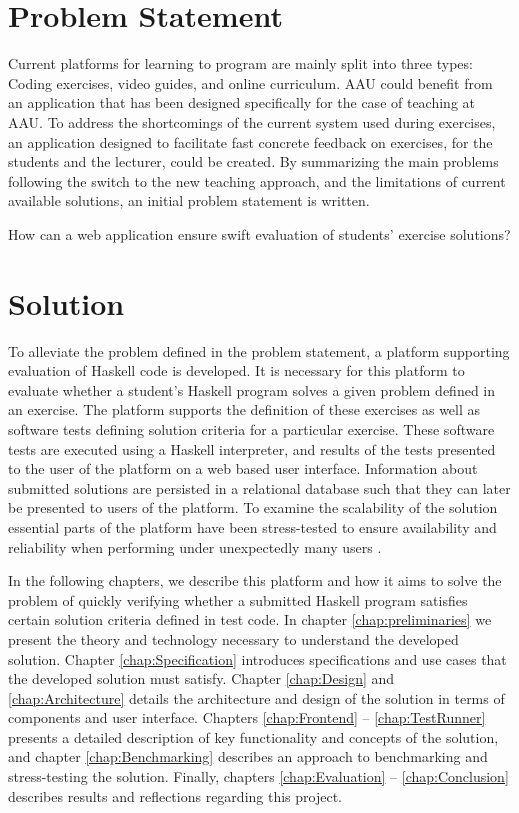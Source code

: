 {\section{Problem Statement}
Current platforms for learning to program are mainly split into three types: Coding exercises, video guides, and online curriculum. 
AAU could benefit from an application that has been designed specifically for the case of teaching at AAU.
To address the shortcomings of the current system used during exercises, an application designed to facilitate fast concrete feedback on exercises, for the students and the lecturer, could be created.
By summarizing the main problems following the switch to the new teaching approach, and the limitations of current available solutions, an initial problem statement is written.
\begin{displayquote}
    How can a web application ensure swift evaluation of students' exercise solutions?
\end{displayquote}

\section{Solution}
To alleviate the problem defined in the problem statement, a platform supporting evaluation of Haskell code is developed. It is necessary for this platform to evaluate whether a student's Haskell program solves a given problem defined in an exercise. The platform supports the definition of these exercises as well as software tests defining solution criteria for a particular exercise. These software tests are executed using a Haskell interpreter, and results of the tests presented to the user of the platform on a web based user interface.
Information about submitted solutions are persisted in a relational database such that they can later be presented to users of the platform.
To examine the scalability of the solution essential parts of the platform have been stress-tested to ensure availability and reliability when performing under unexpectedly many users \cite{Sommerville10}.

In the following chapters, we describe this platform and how it aims to solve the problem of quickly verifying whether a submitted Haskell program satisfies certain solution criteria defined in test code.
In chapter \ref{chap:preliminaries} we present the theory and technology necessary to understand the developed solution.
Chapter \ref{chap:Specification} introduces specifications and use cases that the developed solution must satisfy.
Chapter \ref{chap:Design} and \ref{chap:Architecture} details the architecture and design of the solution in terms of components and user interface.
Chapters \ref{chap:Frontend} -- \ref{chap:TestRunner} presents a detailed description of key functionality and concepts of the solution, and chapter \ref{chap:Benchmarking} describes an approach to benchmarking and stress-testing the solution.
Finally, chapters \ref{chap:Evaluation} -- \ref{chap:Conclusion} describes results and reflections regarding this project.

}
